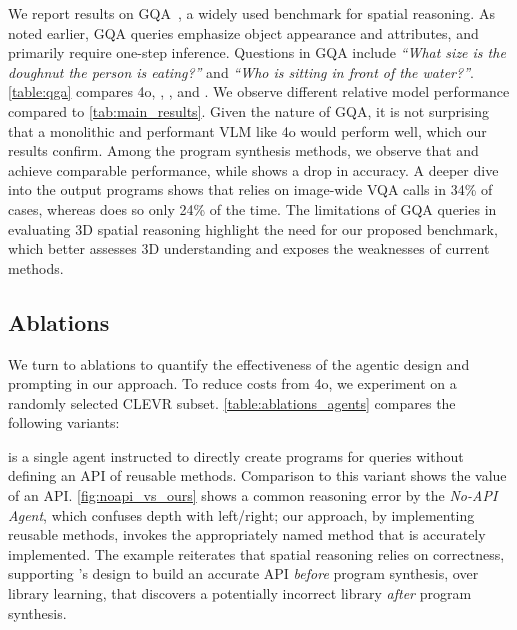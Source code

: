 We report results on GQA~\cite{gqa}, a widely used benchmark for spatial reasoning. 
As noted earlier, GQA queries emphasize object appearance and attributes, and primarily require one-step inference.
Questions in GQA include \emph{“What size is the doughnut the person is eating?”} and \emph{“Who is sitting in front of the water?”}. 
\cref{table:qga} compares \gpt4o, \viper, \visprog, and \method.
We observe different relative model performance compared to \cref{tab:main_results}.
Given the nature of GQA, it is not surprising that a monolithic and performant VLM like \gpt4o would perform well, which our results confirm. Among the program synthesis methods, we observe that \method and \visprog achieve comparable performance, while \viper shows a drop in accuracy. 
A deeper dive into the output programs shows that \visprog relies on image-wide VQA calls in 34\% of cases, whereas \method does so only 24\% of the time.
The limitations of GQA queries in evaluating 3D spatial reasoning highlight the need for our proposed benchmark, which better assesses 3D understanding and exposes the weaknesses of current methods.


\subsection{Ablations}
We turn to ablations to quantify the effectiveness of the agentic design and prompting in our approach. To reduce costs from \gpt4o, we experiment on a randomly selected CLEVR subset. \cref{table:ablations_agents} compares the following variants:



 is a single agent instructed to directly create programs for queries without defining an API of reusable methods. Comparison to this variant shows the value of an API. 
\cref{fig:noapi_vs_ours} shows a common reasoning error by the \emph{No-API Agent}, which confuses depth with left/right; our approach, by implementing reusable methods, invokes the appropriately named method that is accurately implemented.
The example reiterates that spatial reasoning relies on correctness, supporting \method's design to build an accurate API \textit{before} program synthesis, over library learning, that discovers a potentially incorrect library \textit{after} program synthesis.

